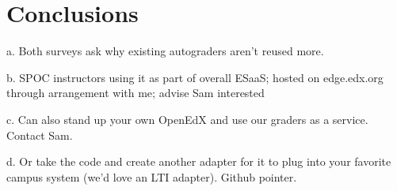 \section{Conclusions}



a.	Both surveys ask why existing autograders aren't reused more.

b.	SPOC instructors using it as part of overall ESaaS; hosted on edge.edx.org through arrangement with me; advise Sam interested

c.	Can also stand up your own OpenEdX and use our graders as a service. Contact Sam.

d.	Or take the code and create another adapter for it to plug into your favorite campus system (we'd love an LTI adapter).  Github pointer.



